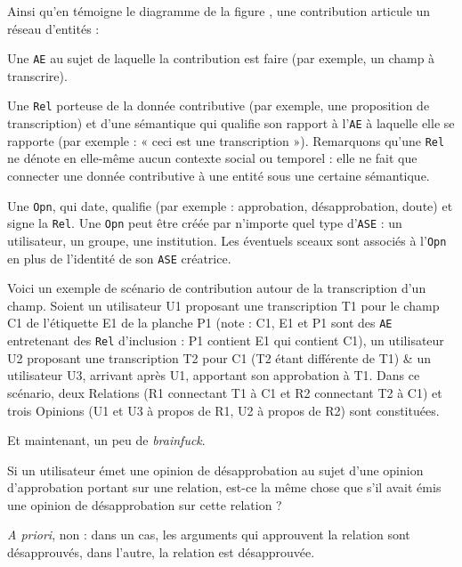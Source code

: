Ainsi qu'en témoigne le diagramme de la figure , une contribution articule un réseau d'entités :

\startitemize
	\item
	Une {\tt AE} au sujet de laquelle la contribution est faire (par exemple, un champ à transcrire).
	\item
	Une {\tt Rel} porteuse de la donnée contributive (par exemple, une proposition de transcription) et d'une sémantique qui qualifie son rapport à l'{\tt AE} à laquelle elle se rapporte (par exemple : « ceci est une transcription »).
	Remarquons qu'une {\tt Rel} ne dénote en elle-même aucun contexte social ou temporel : elle ne fait que connecter une donnée contributive à une entité sous une certaine sémantique.
	\item
	Une {\tt Opn}, qui date, qualifie (par exemple : approbation, désapprobation, doute) et signe la {\tt Rel}.
	Une {\tt Opn} peut être créée par n'importe quel type d'{\tt ASE} : un utilisateur, un groupe, une institution.
	Les éventuels sceaux sont associés à l'{\tt Opn} en plus de l'identité de son {\tt ASE} créatrice.
\stopitemize

Voici un exemple de scénario de contribution autour de la transcription d'un champ.
Soient un utilisateur U1 proposant une transcription T1 pour le champ C1 de l'étiquette E1 de la planche P1 (note : C1, E1 et P1 sont des {\tt AE} entretenant des {\tt Rel} d'inclusion : P1 contient E1 qui contient C1), un utilisateur U2 proposant une transcription T2 pour C1 (T2 étant différente de T1) & un utilisateur U3, arrivant après U1, apportant son approbation à T1.
Dans ce scénario, deux Relations (R1 connectant T1 à C1 et R2 connectant T2 à C1) et trois Opinions (U1 et U3 à propos de R1, U2 à propos de R2) sont constituées.

\bigskip

Et maintenant, un peu de {\it brainfuck}.

Si un utilisateur émet une opinion de désapprobation au sujet d'une opinion d'approbation portant sur une relation, est-ce la même chose que s'il avait émis une opinion de désapprobation sur cette relation ?

{\it A priori}, non : dans un cas, les arguments qui approuvent la relation sont désapprouvés, dans l'autre, la relation est désapprouvée.
